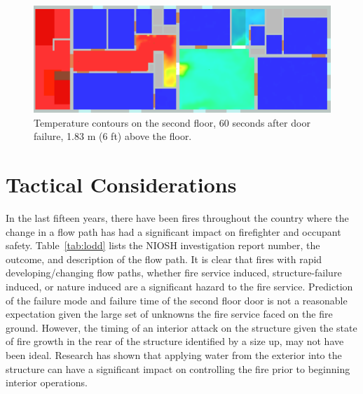 \documentclass[11pt,oneside]{book}
\begin{document}
\begin{figure}[h!]
\centering
\includegraphics[width=.7\textwidth]{../Figures/west_50th_baseline_top_220_6ft}
 

\caption{Temperature contours on the second floor, 60 seconds after door failure, 1.83 m (6 ft) above the floor.}
\label{fig:temp_top_220}
\end{figure}


\section{Tactical Considerations}
In the last fifteen years, there have been fires throughout the country where the change in a flow path has had a significant impact on firefighter and occupant safety. Table~\ref{tab:lodd} lists the NIOSH investigation report number, the outcome, and description of the flow path. It is clear that fires with rapid developing/changing flow paths, whether fire service induced, structure-failure induced, or nature induced are a significant hazard to the fire service. Prediction of the failure mode and failure time of the second floor door is not a reasonable expectation given the large set of unknowns the fire service faced on the fire ground. However, the timing of an interior attack on the structure given the state of fire growth in the rear of the structure identified by a size up, may not have been ideal. Research has shown that applying water from the exterior \cite{madrzykowski2009fire,kerber2009fire} into the structure can have a significant impact on controlling the fire prior to beginning interior operations.
\end{document}

